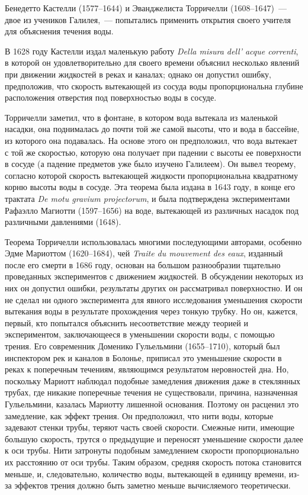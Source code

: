 Бенедетто Кастелли (1577--1644) и Эванджелиста Торричелли (1608--1647)~--- двое из учеников 
Галилея,~--- попытались применить открытия своего учителя для объяснения течения воды.

В 1628 году Кастелли издал маленькую работу \textit{Della misura dell' acque correnti}, в которой он 
удовлетворительно для своего времени объяснил несколько явлений при движении жидкостей 
в реках и каналах; однако он допустил ошибку, предположив, что скорость вытекающей 
из сосуда воды пропорциональна глубине расположения отверстия под поверхностью воды в сосуде.

Торричелли заметил, что в фонтане, в котором вода вытекала из маленькой насадки, 
она поднималась до почти той же самой высоты, что и вода в бассейне, из которого она подавалась. 
На основе этого он предположил, что вода вытекает с той же скоростью, которую она получает 
при падении с высоты ее поверхности в сосуде (а падение предметов уже было изучено Галилеем). 
Он вывел теорему, согласно 
которой скорость вытекающей жидкости пропорциональна квадратному корню высоты воды в сосуде. 
Эта теорема была издана в 1643 году, в конце его трактата \textit{De motu gravium projectorum}, и была 
подтверждена экспериментами Рафаэлло Магиотти (1597--1656) на воде, вытекающей из различных 
насадок под различными давлениями (1648).

Теорема Торричелли использовалась многими последующими авторами, особенно 
Эдме Мариоттом (1620--1684), чей \textit{Traite du mouvement des eaux}, изданный после его смерти 
в 1686 году, основан на большом разнообразии тщательно проведанных экспериментов 
с движением жидкостей. В обсуждении некоторых из них он допустил ошибки, результаты 
других он рассматривал поверхностно. И он не сделал ни одного эксперимента для явного 
исследования уменьшения скорости вытекания воды в результате прохождения через тонкую трубку. 
Но он, кажется, первый, кто попытался объяснить несоответствие между теорией и экспериментом, 
заключающееся в уменьшении скорости воды, с помощью трения. Его современник Доменико 
Гульельмини (1655--1710), который был инспектором рек и каналов в Болонье, приписал 
это уменьшение скорости в реках к поперечным течениям, являющимся результатом неровностей дна. 
Но, поскольку Мариотт наблюдал подобные замедления движения даже в стеклянных трубах, 
где никакие поперечные течения не существовали, причина, назначенная Гульельмини, казалась 
Мариотту лишенной основания. Поэтому он расценил это замедление, как эффект трения. 
Он предположил, что нити воды, которые задевают стенки трубы, теряют часть своей скорости. 
Смежные нити, имеющие большую скорость, трутся о предыдущие и переносят уменьшение скорости 
далее к оси трубы. Нити затронуты подобным замедлением скорости пропорционально их 
расстоянию от оси трубы. Таким образом, средняя скорость потока становится меньше, и, 
следовательно, количество воды, вытекающей в единицу времени, из-за эффектов трения 
должно быть заметно меньше вычисляемого теоретически.

